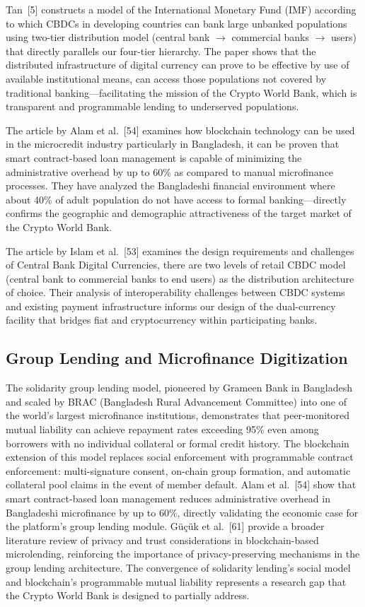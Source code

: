 \documentclass[12pt,a4paper]{report}
\begin{document}
Tan~[5] constructs a model of the International Monetary Fund (IMF) according to which CBDCs in developing countries can bank large unbanked populations using two-tier distribution model (central bank $\to$ commercial banks $\to$ users) that directly parallels our four-tier hierarchy. The paper shows that the distributed infrastructure of digital currency can prove to be effective by use of available institutional means, can access those populations not covered by traditional banking---facilitating the mission of the Crypto World Bank, which is transparent and programmable lending to underserved populations.

The article by Alam et al.~[54] examines how blockchain technology can be used in the microcredit industry particularly in Bangladesh, it can be proven that smart contract-based loan management is capable of minimizing the administrative overhead by up to 60\% as compared to manual microfinance processes. They have analyzed the Bangladeshi financial environment where about 40\% of adult population do not have access to formal banking---directly confirms the geographic and demographic attractiveness of the target market of the Crypto World Bank.

The article by Islam et al.~[53] examines the design requirements and challenges of Central Bank Digital Currencies, there are two levels of retail CBDC model (central bank to commercial banks to end users) as the distribution architecture of choice. Their analysis of interoperability challenges between CBDC systems and existing payment infrastructure informs our design of the dual-currency facility that bridges fiat and cryptocurrency within participating banks.

\subsection{Group Lending and Microfinance Digitization}

The solidarity group lending model, pioneered by Grameen Bank in Bangladesh and scaled by BRAC (Bangladesh Rural Advancement Committee) into one of the world's largest microfinance institutions, demonstrates that peer-monitored mutual liability can achieve repayment rates exceeding 95\% even among borrowers with no individual collateral or formal credit history. The blockchain extension of this model replaces social enforcement with programmable contract enforcement: multi-signature consent, on-chain group formation, and automatic collateral pool claims in the event of member default. Alam et al.~[54] show that smart contract-based loan management reduces administrative overhead in Bangladeshi microfinance by up to 60\%, directly validating the economic case for the platform's group lending module. Güçük et al.~[61] provide a broader literature review of privacy and trust considerations in blockchain-based microlending, reinforcing the importance of privacy-preserving mechanisms in the group lending architecture. The convergence of solidarity lending's social model and blockchain's programmable mutual liability represents a research gap that the Crypto World Bank is designed to partially address.
\end{document}
